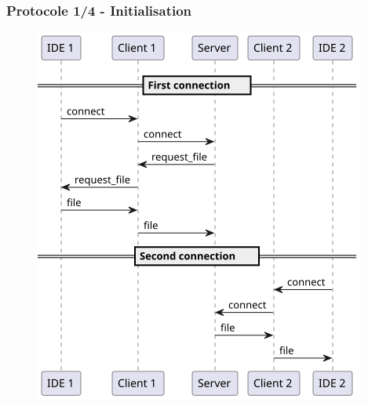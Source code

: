 \documentclass{beamer}
\begin{document}
\begin{frame}
    \frametitle{Protocole 1/4 - Initialisation}
    \begin{figure}
        \includegraphics[width=\textwidth,height=0.8\textheight,keepaspectratio]{diagrams/1.png}
    \end{figure}
\end{frame}
\end{document}
